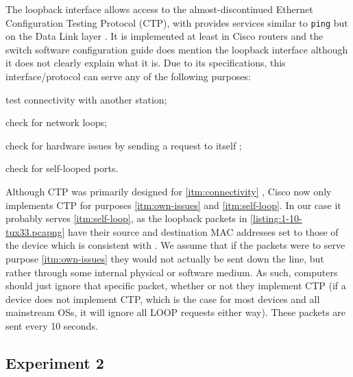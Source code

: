 \documentclass[a4paper, 11pt]{report}
\begin{document}
The loopback interface allows access to the almost-discontinued Ethernet Configuration Testing Protocol (CTP)\cite{how-ethernet-keepalive-works}\cite[ch.~8]{ethernet}, with provides services similar to \texttt{ping} but on the Data Link layer \cite{jhawk}. It is implemented at least in Cisco routers \cite{jhawk}\cite{whats-a-loop-traffic-in-ethereal} and the switch software configuration guide \cite{cisco-switch-manual} does mention the loopback interface although it does not clearly explain what it is. Due to its specifications, this interface/protocol can serve any of the following purposes:
\begin{enumerate*}[label=(\arabic*)]
    \item \label{itm:connectivity} test connectivity with another station;
    \item \label{itm:loops} check for network loops;
    \item \label{itm:own-issues} check for hardware issues by sending a request to itself \cite{whats-a-loop-traffic-in-ethereal};
    \item \label{itm:self-loop} check for self-looped ports.
\end{enumerate*}
Although CTP was primarily designed for \ref{itm:connectivity} \cite[sec.~8.1]{ethernet}, Cisco now only implements CTP for purposes \ref{itm:own-issues} and \ref{itm:self-loop}\cite{whats-a-loop-traffic-in-ethereal}. In our case it probably serves \ref{itm:self-loop}, as the loopback packets in \ref{listing:1-10-tux33.pcapng} have their source and destination MAC addresses set to those of the device which is consistent with \cite{whats-a-loop-traffic-in-ethereal}. We assume that if the packets were to serve purpose \ref{itm:own-issues} they would not actually be sent down the line, but rather through some internal physical or software medium. As such, computers should just ignore that specific packet, whether or not they implement CTP (if a device does not implement CTP, which is the case for most devices and all mainstream OSs, it will ignore all LOOP requests either way). These packets are sent every 10 seconds.

\subsection{Experiment 2} \label{sec:Exp2}
\end{document}
